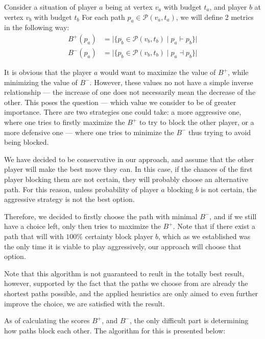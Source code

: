 \documentclass[12pt]{article}
\newcommand*{\p}{\ensuremath{\mathcal{P}}}
\newcommand*{\blocks}{\vdash}
\newcommand*{\blockedBy}{\dashv}
\newcommand*{\blockingScore}{B^+}
\newcommand*{\blockedScore}{B^-}
\begin{document}
Consider a situation of player $a$ being at vertex $v_a$ with budget $t_a$,
and player $b$ at vertex $v_b$ with budget $t_b$
For each path $p_a \in \p(v_a, t_a)$, we will define 2 metrics in the following way:
\begin{align}
    \blockingScore(p_a) & = \big| \{ p_b \in \p(v_b,t_b) \mid p_a \blocks p_b \} \big| \label{eq:blocking_score}   \\[.5ex]
    \blockedScore(p_a)  & = \big| \{ p_b \in \p(v_b,t_b) \mid p_a \blockedBy p_b \} \big| \label{eq:blocked_score}
\end{align}

It is obvious that the player $a$ would want to maximize the value of $\blockingScore$,
while minimizing the value of $\blockedScore$.
However, these values no not have a simple inverse relationship --- the increase of one does not necessarily mean the decrease of the other.
This poses the question --- which value we consider to be of greater importance.
There are two strategies one could take: a more aggressive one, where one tries to firstly maximize the $\blockingScore$ to try to block the other player,
or a more defensive one --- where one tries to minimize the $\blockedScore$ thus trying to avoid being blocked.

We have decided to be conservative in our approach, and assume that the other player will make the best move they can.
In this case, if the chances of the first player blocking them are not certain, they will probably choose an alternative path.
For this reason, unless probability of player $a$ blocking $b$ is not certain, the aggressive strategy is not the best option.

Therefore, we decided to firstly choose the path with minimal $\blockedScore$,
and if we still have a choice left, only then tries to maximize the $\blockingScore$.
Note that if there exist a path that will with $100\%$ certainty block player $b$,
which as we established was the only time it is viable to play aggressively, our approach will choose that option.

Note that this algorithm is not guaranteed to reult in the totally best result,
however, supported by the fact that the paths we choose from are already the shortest paths possible,
and the applied heuristics are only aimed to even further improve the choice, we are satisfied with the result.

As of calculating the scores $\blockingScore$, and $\blockedScore$, the only difficult part is determining how paths block each other.
The algorithm for this is presented below:
\end{document}

